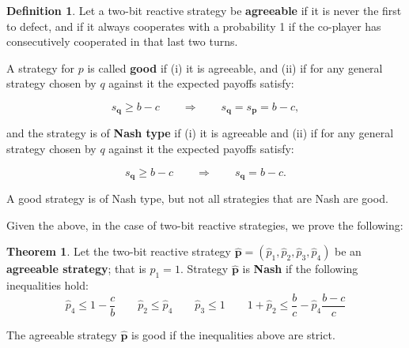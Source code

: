 \documentclass{article}
\theoremstyle{definition}
\newtheorem{definition}{Definition}[section]
\newtheorem{theorem}{Theorem}[section]
\begin{document}
\begin{definition}
Let a two-bit reactive strategy be \textbf{agreeable} if it is never the first to
defect, and if it always cooperates with a probability 1 if the co-player has
consecutively cooperated in that last two turns.

A strategy for \(p\) is called \textbf{good} if
(i) it is agreeable, and (ii) if for any general strategy chosen by \(q\)
against it the expected payoffs satisfy:

\vspace{-.5cm}

\begin{equation}
    s_{\mathbf{q}} \geq b\!-\!c \qquad \Rightarrow \qquad s_{\mathbf{q}} = s_{\mathbf{p}} =  b\!-\!c,
\end{equation}

and the strategy is of \textbf{Nash type} if (i) it is agreeable and (ii)
if for any general strategy chosen by \(q\) against it the expected payoffs satisfy:

\vspace{-.5cm}

\begin{equation}
    s_{\mathbf{q}} \geq b\!-\!c \qquad \Rightarrow \qquad s_{\mathbf{q}} =  b\!-\!c.
\end{equation}

A good strategy is of Nash type, but not all strategies that are Nash are good.
\end{definition}

Given the above, in the case of two-bit reactive strategies, we prove the
following:

\begin{theorem}\label{theorem:two_bit_nash_and_good}
    Let the two-bit reactive strategy \(\mathbf{\hat{p}} = (\hat{p}_{1}, \hat{p}_{2}, \hat{p}_{3}, \hat{p}_{4})\) be an \textbf{agreeable
    strategy}; that is \(\hat{p}_1 = 1\). Strategy \(\mathbf{\hat{p}}\) is \textbf{Nash} if the
    following inequalities hold:
    \begin{equation*}
        \hat{p}_4 \leq 1 - \frac{c}{b} \qquad  \hat{p}_2  \leq \hat{p}_4 \qquad \hat{p}_3 \leq 1 \qquad 1 + \hat{p}_2 \leq \frac{b}{c} - \hat{p}_4 \frac{b\!-\!c}{c}
    \end{equation*}
    
    The agreeable strategy \(\mathbf{\hat{p}}\) is good if the inequalities above are strict.
    \end{theorem}
    
\end{document}
